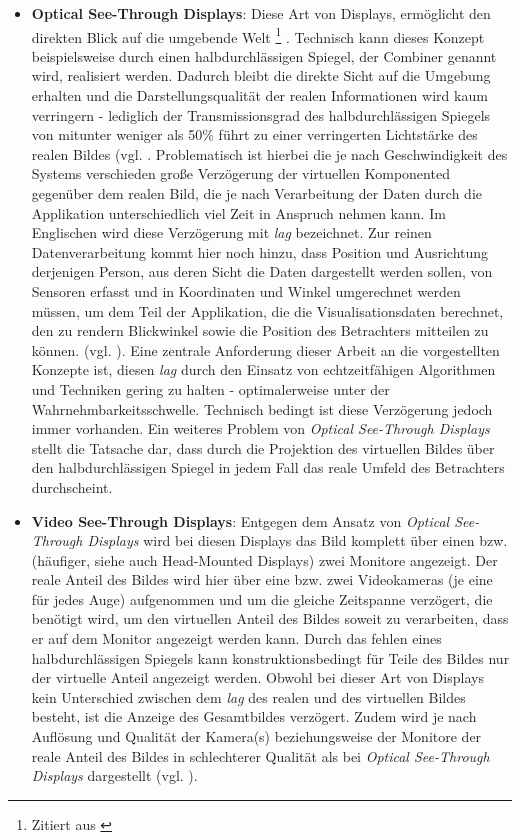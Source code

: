 \documentclass[pdftex,a4paper,titlepage,12pt]{scrartcl}
\newtheorem[L]{boxedDefinition}{Definition}
\newcommand{\footnoteremember}[2]{
  \footnote{#2}
  \newcounter{#1}
  \setcounter{#1}{\value{footnote}}
}
\newcommand{\footnoterecall}[1]{
  \footnotemark[\value{#1}]
}
\begin{document}
\begin{itemize}
 \item \textbf{Optical See-Through Displays}: Diese Art von Displays, ermöglicht den \glqq direkten Blick auf die umgebende Welt\grqq\footnoteremember{f:Toe2010-S21}{Zitiert aus \cite[Kapitel 2.2, Seite 21f.]{Toe2010}}. Technisch kann dieses Konzept beispielsweise durch einen halbdurchlässigen Spiegel, der Combiner genannt wird, realisiert werden. Dadurch bleibt die \glqq direkte Sicht auf die Umgebung\grqq\footnoterecall{f:Toe2010-S21} erhalten und die Darstellungsqualität der realen Informationen wird kaum verringern - lediglich der Transmissionsgrad des halbdurchlässigen Spiegels von mitunter weniger als 50\% führt zu einer verringerten Lichtstärke des realen Bildes (vgl. \cite[Kapitel 3.1.3, Seite 7]{Suthau2002DE}. Problematisch ist hierbei die je nach Geschwindigkeit des Systems verschieden große Verzögerung der virtuellen Komponented gegenüber dem realen Bild, die je nach Verarbeitung der Daten durch die Applikation unterschiedlich viel Zeit in Anspruch nehmen kann. Im Englischen wird diese Verzögerung mit \textit{lag} bezeichnet. Zur reinen Datenverarbeitung kommt hier noch hinzu, dass Position und Ausrichtung derjenigen Person, aus deren Sicht die Daten dargestellt werden sollen, von Sensoren erfasst und in Koordinaten und Winkel umgerechnet werden müssen, um dem Teil der Applikation, die die Visualisationsdaten berechnet, den zu rendern Blickwinkel sowie die Position des Betrachters mitteilen zu können. (vgl. \cite[Kapitel 2.2, Seite 21f.]{Toe2010}). Eine zentrale Anforderung dieser Arbeit an die vorgestellten Konzepte ist, diesen \textit{lag} durch den Einsatz von echtzeitfähigen Algorithmen und Techniken gering zu halten - optimalerweise unter der Wahrnehmbarkeitsschwelle. Technisch bedingt ist diese Verzögerung jedoch immer vorhanden. Ein weiteres Problem von \textit{Optical See-Through Displays} stellt die Tatsache dar, dass durch die Projektion des virtuellen Bildes über den halbdurchlässigen Spiegel in jedem Fall das reale Umfeld des Betrachters durchscheint.
 \item \textbf{Video See-Through Displays}: Entgegen dem Ansatz von \textit{Optical See-Through Displays} wird bei diesen Displays das Bild komplett über einen bzw. (häufiger, siehe auch \glqq Head-Mounted Displays\grqq) zwei Monitore angezeigt. Der reale Anteil des Bildes wird hier über eine bzw. zwei Videokameras (je eine für jedes Auge) aufgenommen und um die gleiche Zeitspanne verzögert, die benötigt wird, um den virtuellen Anteil des Bildes soweit zu verarbeiten, dass er auf dem Monitor angezeigt werden kann. Durch das fehlen eines halbdurchlässigen Spiegels kann konstruktionsbedingt für Teile des Bildes nur der virtuelle Anteil angezeigt werden.
 Obwohl bei dieser Art von Displays kein Unterschied zwischen dem \textit{lag} des realen und des virtuellen Bildes besteht, ist die Anzeige des Gesamtbildes verzögert. Zudem wird je nach Auflösung und Qualität der Kamera(s) beziehungsweise der Monitore der reale Anteil des Bildes in schlechterer Qualität als bei \textit{Optical See-Through Displays} dargestellt (vgl. \cite[Kapitel 2.2, Seite 22]{Toe2010}). 
\end{itemize}
\end{document}
